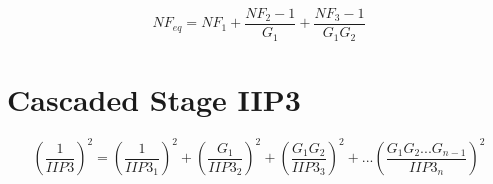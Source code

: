 \begin{equation}
	NF_{eq}= NF_1 + \frac{NF_2-1}{G_1} + \frac{NF_3-1}{G_1G_2} 
\end{equation}


\section{Cascaded Stage IIP3} %
\label{sec:cascaded_stage_iip3}

\begin{equation}
\left ( \frac {1} {IIP3} \right)^2 = \left( \frac {1} {IIP3_1}  \right)^2 + \left( \frac{G_1}{IIP3_2}  \right)^2 + \left( \frac {G_1G_2} {IIP3_3}  \right)^2 + ...\left( \frac {G_1G_2...G_{n-1}} {IIP3_n}  \right)^2
\end{equation}







